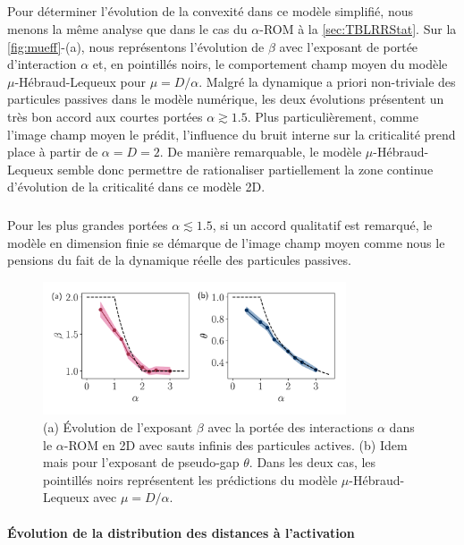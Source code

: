 \subparagraph{}Pour déterminer l'évolution de la convexité dans ce modèle simplifié, nous menons la même analyse que dans le cas du $\alpha$-ROM à la \autoref{sec:TBLRRStat}. Sur la \autoref{fig:mueff}-(a), nous représentons l'évolution de $\beta$ avec l'exposant de portée d'interaction $\alpha$ et, en pointillés noirs, le comportement champ moyen du modèle $\mu$-Hébraud-Lequeux pour $\mu = D/\alpha$. Malgré la dynamique a priori non-triviale des particules passives dans le modèle numérique, les deux évolutions présentent un très bon accord aux courtes portées $\alpha \gtrsim 1.5$. Plus particulièrement, comme l'image champ moyen le prédit, l'influence du bruit interne sur la criticalité prend place à partir de $\alpha = D = 2$. De manière remarquable, le modèle $\mu$-Hébraud-Lequeux semble donc permettre de rationaliser partiellement la zone continue d'évolution de la criticalité dans ce modèle 2D.

\subparagraph{}Pour les plus grandes portées $\alpha\lesssim 1.5$, si un accord qualitatif est remarqué, le modèle en dimension finie se démarque de l'image champ moyen comme nous le pensions du fait de la dynamique réelle des particules passives.

\begin{figure}[h]
	\centering
	\includegraphics[width=0.8\textwidth]{Chapitre3/Figures/Interpretation/beta_alphaMF.pdf}
	\caption{(a) Évolution de l'exposant $\beta$ avec la portée des interactions $\alpha$ dans le $\alpha$-ROM en 2D avec sauts infinis des particules actives. (b) Idem mais pour l'exposant de pseudo-gap $\theta$. Dans les deux cas, les pointillés noirs représentent les prédictions du modèle $\mu$-Hébraud-Lequeux avec $\mu = D/\alpha$.}
	\label{fig:mueff}
\end{figure}

\paragraph{Évolution de la distribution des distances à l'activation}

